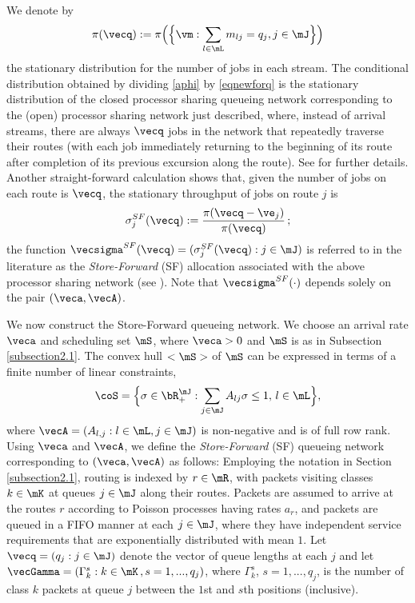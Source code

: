 \documentclass{amsart}
\begin{document}
We denote by
\begin{equation}
\label{eqnewforq}
\pi(\vecq) := \pi\Big(\Big\{ \vm : \sum_{l\in\mL} m_{lj}=q_j, j\in\mJ \Big\}\Big) 
\end{equation}
the stationary distribution for the number of jobs in each stream. 
The conditional distribution obtained by dividing \eqref{aphi} by \eqref{eqnewforq} is the stationary distribution of the closed processor sharing queueing network corresponding to the (open) processor sharing network just described, where, instead of arrival streams, there are always
  $\vecq$ jobs in the network that repeatedly traverse their routes (with each job immediately returning to the beginning of its route after completion of its previous excursion along the route). See \citet[][Chapter 3.4]{Ke79} for further details.
Another straight-forward calculation shows that, given the number of jobs on each route is $\vecq$, the stationary throughput of jobs on route $j$ is
\begin{equation}\label{Store-Forward}
\sigma^{SF}_j(\vecq):= \frac{\pi(\vecq-\ve_j)}{\pi(\vecq)}\,;
\end{equation}
the function $\vecsigma^{SF}(\vecq)=(\sigma_j^{SF}(\vecq): j\in\mJ)$ is referred to in the literature as the \emph{Store-Forward} (SF) allocation associated with the above
processor sharing network (see \cite{BoPr03}). 
Note that $\vecsigma^{SF}(\cdot)$ depends solely on the pair $(\veca, \vecA)$.

We now construct the Store-Forward queueing network.  
We choose an arrival rate $\veca$ and scheduling set $\mS$, where $\veca >0$ and $\mS$ is as in Subsection
\ref{subsection2.1}.  The convex hull $<\mS>$ of $\mS$ can be expressed in terms of
a finite number of linear constraints, 
\begin{equation}\label{Polytope}
\coS =\Big \{ \sigma\in\bR_+^\mJ : \sum_{j\in\mJ} A_{lj} \sigma \leq 1,\, l\in\mL \Big\},
\end{equation}
where $\vecA = (A_{l,j}: l\in \mL, j\in \mJ)$ is non-negative and is of full row rank.  Using $\veca$
and $\vecA$, we define the \emph{Store-Forward} (SF) queueing network corresponding
to $(\veca, \vecA)$ as follows:
Employing the notation in Section \ref{subsection2.1}, routing is indexed by $r\in\mR$, with
packets visiting classes $k\in\mK$ at queues $j\in\mJ$ along their routes.  Packets 
are assumed to arrive at the routes $r$ according to Poisson processes having rates $a_r$, 
and packets are queued in a FIFO manner at each $j\in\mJ$, where they have independent service
 requirements that are exponentially distributed with mean $1$.  Let $\vecq=(q_j : j\in\mJ)$ denote the vector of queue lengths at each $j$ and let $\vecGamma=(\Gamma_k^s : k\in\mK\,,s=1,...,q_j)$, where $\Gamma_k^s$, $s=1,...,q_j$, is the number of class $k$ packets at queue $j$ between the $1$st and $s$th positions (inclusive). 
\end{document}

